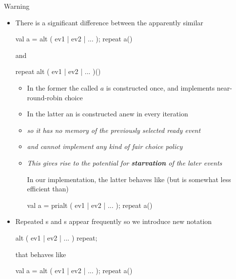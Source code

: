 \documentclass{concdistfoils}
\def\heading#1{\begin{cframed}[8.8in]{#1}\end{cframed}}
\begin{document}
\begin{slide}
\heading{Warning}

\begin{itemize}
\item There is a significant difference between the apparently similar
\begin{scala}

        val a = alt ( ev1 | ev2 | ... ); repeat { a() }
\end{scala}
and
\begin{scala}
        repeat { alt ( ev1 | ev2 | ... )() }
\end{scala}
\vfill
\begin{itemize}
\item In the former the  called $a$ is constructed once, and implements 
      near-round-robin choice
\vfill
\item In the latter an  is constructed anew in every iteration
\item[] \textit{so it has no memory of the previously selected ready event}
\item[] \textit{and cannot implement any kind of fair choice policy}
\item[] \textit{This gives rise to the potential for \textbf{starvation} of the later events}
\begin{note}
In our implementation, the latter behaves like (but is somewhat less efficient than)
\begin{scala}
        val a = prialt ( ev1 | ev2 | ... ); repeat { a() }
\end{scala}
\end{note}
\end{itemize}
\end{itemize}
\end{slide}

\begin{slide}
\begin{itemize}
\item Repeated s and s appear frequently so we introduce new notation

\begin{scala}

        alt ( ev1 | ev2 | ... ) repeat;
        
\end{scala}
that behaves like
\begin{scala}

        val a = alt ( ev1 | ev2 | ... ); repeat { a() }
\end{scala}
\vfill
\end{itemize}
\end{slide}
\end{document}
